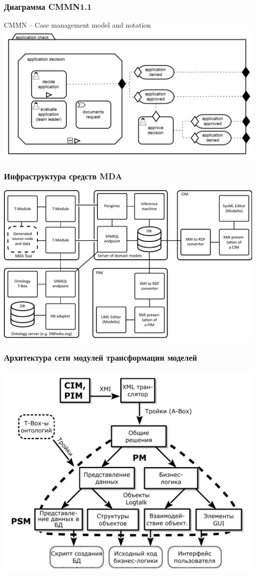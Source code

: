 \documentclass[10pt]{beamer}
\begin{document}
\begin{frame}
  \frametitle{Диаграмма CMMN1.1}
  CMMN -- Case management model and notation
  \centering
    \includegraphics[width=1\linewidth]{qms-pics/cmmn.png}
\end{frame}

\begin{frame}
  \frametitle{Инфраструктура средств MDA}
  \centering
  \includegraphics[width=1\linewidth]{qms-pics/architecture-mda-lod-ext.pdf}
\end{frame}

\begin{frame}
  \frametitle{Архитектура сети модулей трансформации моделей}
  \centering
  \includegraphics[width=0.9\linewidth]{qms-pics/architect_tree_pres-ru-wo-OCL.pdf}
\end{frame}
\end{document}
